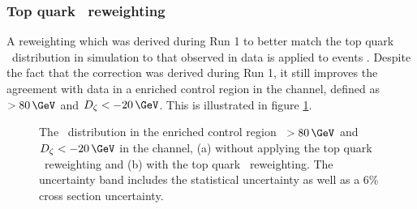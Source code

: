\subsubsection*{Top quark \pT~reweighting}
A reweighting which was derived during Run 1
to better match the top quark \pT~distribution in simulation
to that observed in data is applied to \ttbar events \cite{topptrwt}. Despite
the fact that the correction was derived during Run 1, it still
improves the agreement with data in a \ttbar enriched
control region in the \emu channel, defined as 
\MET~$>80\,\GeV$ and $D_{\zeta}<-20\,\GeV$. This
is illustrated in figure \ref{fig:mssm_corrs_toppt}.
\begin{figure}[h!]
\begin{center}
\end{center}
\caption[The \mTtot~distribution in the \ttbar
enriched control region, with and without applying top quark \pT~reweighting.]{The \mTtot~distribution in the \ttbar enriched control region \MET~$>80\,\GeV$ and $D_{\zeta}<-20\,\GeV$ in the \emu channel,
(a) without applying the top quark \pT~reweighting and (b) with the top quark \pT~reweighting.
The uncertainty band includes the statistical uncertainty as well as a 6\% \ttbar cross section uncertainty.}
\label{fig:mssm_corrs_toppt}
\end{figure}

